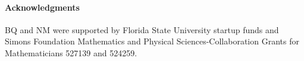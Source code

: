 \documentclass{jfm}
\begin{document}
\paragraph{\bf Acknowledgments} BQ and NM were supported by Florida
State University startup funds and Simons Foundation Mathematics and
Physical Sciences-Collaboration Grants for Mathematicians 527139 and
524259.

 

\end{document}
